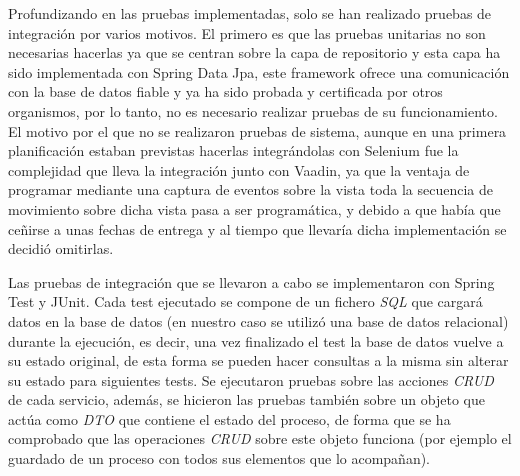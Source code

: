 	
	Profundizando en las pruebas implementadas, solo se han realizado pruebas de integración por varios motivos. El primero es que las pruebas unitarias no son necesarias hacerlas ya que se centran sobre la capa de repositorio y esta capa ha sido implementada con Spring Data Jpa\cite{jpa}, este framework ofrece una comunicación con la base de datos fiable y ya ha sido probada y certificada por otros organismos, por lo tanto, no es necesario realizar pruebas de su funcionamiento. El motivo por el que no se realizaron pruebas de sistema, aunque en una primera planificación estaban previstas hacerlas integrándolas con Selenium\cite{selenium} fue la complejidad que lleva la integración junto con Vaadin\cite{vaadin}, ya que la ventaja de programar mediante una captura de eventos sobre la vista toda la secuencia de movimiento sobre dicha vista pasa a ser programática, y debido a que había que ceñirse a unas fechas de entrega y al tiempo que llevaría dicha implementación se decidió omitirlas.

	
	Las pruebas de integración que se llevaron a cabo se implementaron con Spring Test\cite{springTest} y JUnit\cite{junit}. Cada test ejecutado se compone de un fichero \emph{SQL} que cargará datos en la base de datos (en nuestro caso se utilizó una base de datos relacional) durante la ejecución, es decir, una vez finalizado el test la base de datos vuelve a su estado original, de esta forma se pueden hacer consultas a la misma sin alterar su estado para siguientes tests. Se ejecutaron pruebas sobre las acciones \emph{CRUD}\cite{crud} de cada servicio, además, se hicieron las pruebas también sobre un objeto que actúa como \emph{DTO}\cite{dto} que contiene el estado del proceso, de forma que se ha comprobado que las operaciones \emph{CRUD} sobre este objeto funciona (por ejemplo el guardado de un proceso con todos sus elementos que lo acompañan).



